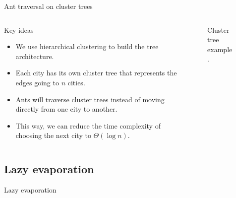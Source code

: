 \documentclass[aspectratio=169]{beamer}
\begin{document}
\begin{frame}{Ant traversal on cluster trees}
    \begin{columns}
        \begin{column}{0.55\textwidth}
            \begin{block}{Key ideas}
                \vspace{0.1cm}
                \begin{itemize}
                    \justifying
                    \item We use hierarchical clustering to build the tree architecture.
                    \item Each city has its own cluster tree that represents the edges going to $n$ cities.
                    \item Ants will traverse cluster trees instead of moving directly from one city to another.
                    \item This way, we can reduce the time complexity of choosing the next city to $\Theta(\log n)$.
                \end{itemize}
                \vspace{0.1cm}
            \end{block}
        \end{column}
        \begin{column}{0.45\textwidth}
            \begin{figure}
                \vspace{0.1cm}
                \centering
                
                \footnotesize \caption{Cluster tree example.}
            \end{figure}
        \end{column}
    \end{columns}
\end{frame}


\subsection{Lazy evaporation}
\begin{frame}{Lazy evaporation}
    \vspace{0.1cm}
    \centering
    
\end{frame}
\end{document}
